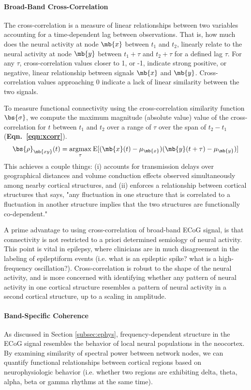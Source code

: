 \paragraph{Broad-Band Cross-Correlation}
The cross-correlation is a measure of linear relationships between two variables accounting for a time-dependent lag between observations. That is, how much does the neural activity at node $\mb{x} $ between $t_1$ and $t_2$, linearly relate to the neural activity at node $\mb{y}$ between $t_1+\tau$ and $t_2+\tau$ for a defined lag $\tau$. For any $\tau$, cross-correlation values closer to 1, or -1, indicate strong positive, or negative, linear relationship between signals $\mb{x}$ and $\mb{y}$. Cross-correlation values approaching 0 indicate a lack of linear similarity between the two signals.  

To measure functional connectivity using the cross-correlation similarity function $\bs{\sigma}$, we compute the maximum magnitude (absolute value) value of the cross-correlation for $t$ between $t_1$ and $t_2$ over a range of $\tau$ over the span of $t_2-t_1$ (\textbf{Eqn.~\ref{eqn:xcorr}}). 
\begin{eqnarray}
    \bs{\rho}_{\mb{xy}}(t) = \underset{\tau}{\operatorname{argmax}}\:{\mathrm{E}}[(\mb{x}(t) - \mu_{\mb{x}})(\mb{y}(t+\tau) - \mu_{\mb{y}})]
    \label{eqn:xcorr}
\end{eqnarray}
This achieves a couple things: (i) accounts for transmission delays over geographical distances and volume conduction effects observed simultaneously among nearby cortical structures, and (ii) enforces a relationship between cortical structures that says, "any fluctuation in one structure that is correlated to a fluctuation in another structure implies that the two structures are functionally co-dependent." 

A prime advantage to using cross-correlation of broad-band ECoG signal, is that connectivity is not restricted to a priori determined semiology of neural activity. This point is vital in epilepsy, where clinicians are in much disagreement in the labeling of epileptiform events (i.e. what is an epileptic spike? what is a high-frequency oscillation?). Cross-correlation is robust to the shape of the neural activity, and is more concerned with identifying whether any pattern of neural activity in one cortical structure resembles a pattern of neural activity in a second cortical structure, up to a scaling in amplitude.

\paragraph{Band-Specific Coherence}
As discussed in Section \ref{subsec:ephys}, frequency-dependent structure in the ECoG signal resembles the behavior of local neural populations in the neocortex. By examining similarity of spectral power between network nodes, we can quantify functional relationships between cortical regions based on neurophysiologic behavior (i.e. whether two regions are exhibiting delta, theta, alpha, beta or gamma rhythms at the same time). 

